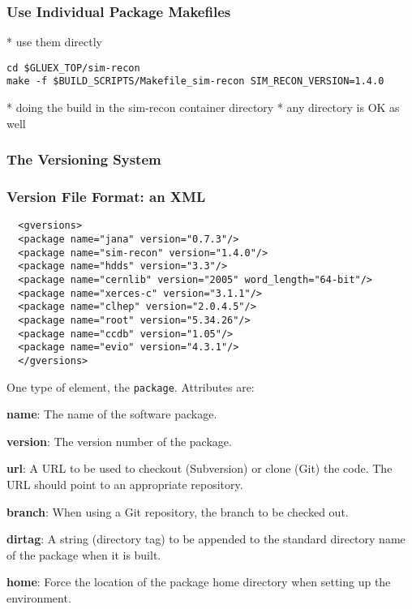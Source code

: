 \documentclass[xcolor=dvipsnames,hyperref={pdfpagelabels=false}]{beamer}
\begin{document}
\begin{frame}[fragile]\frametitle{Use Individual Package Makefiles}

* use them directly

\begin{verbatim}
cd $GLUEX_TOP/sim-recon
make -f $BUILD_SCRIPTS/Makefile_sim-recon SIM_RECON_VERSION=1.4.0
\end{verbatim}

* doing the build in the sim-recon container directory
* any directory is OK as well

\end{frame}
\begin{frame}\frametitle{The Versioning System}\label{section:versioning}

\end{frame}
\begin{frame}[fragile]
  \frametitle{Version File Format: an XML}

\begin{verbatim}
  <gversions>
  <package name="jana" version="0.7.3"/>
  <package name="sim-recon" version="1.4.0"/>
  <package name="hdds" version="3.3"/>
  <package name="cernlib" version="2005" word_length="64-bit"/>
  <package name="xerces-c" version="3.1.1"/>
  <package name="clhep" version="2.0.4.5"/>
  <package name="root" version="5.34.26"/>
  <package name="ccdb" version="1.05"/>
  <package name="evio" version="4.3.1"/>
  </gversions>
\end{verbatim}

One type of element, the {\tt package}. Attributes are:

\begin{description}
\item{\bf name}: The name of the software package.
\item{\bf version}: The version number of the package.
\item{\bf url}: A URL to be used to checkout (Subversion) or clone
  (Git) the code. The URL should point to an appropriate repository.
\item{\bf branch}: When using a Git repository, the branch to be
  checked out.
\item{\bf dirtag}: A string (directory tag) to be appended to the
  standard directory name of the package when it is built.
\item{\bf home}: Force the location of the package home directory when setting up the environment.
\end{description}

\end{frame}
\end{document}
